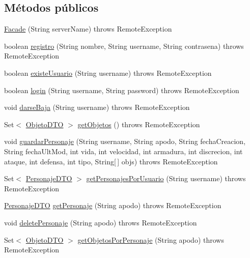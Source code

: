 \subsection*{Métodos públicos}
\begin{DoxyCompactItemize}
\item 
\hyperlink{classes_1_1deusto_1_1spq_1_1_t_e_scc_1_1servidor_1_1_facade_ac697ac7842a1161dec65e9985d496d64}{Facade} (String server\+Name)  throws Remote\+Exception 
\item 
boolean \hyperlink{classes_1_1deusto_1_1spq_1_1_t_e_scc_1_1servidor_1_1_facade_a7c19da5dcaeed4689168bccf1a82b626}{registro} (String nombre, String username, String contrasena)  throws Remote\+Exception 
\item 
boolean \hyperlink{classes_1_1deusto_1_1spq_1_1_t_e_scc_1_1servidor_1_1_facade_ae25a9999c202d8c89edaa92131247ce9}{existe\+Usuario} (String username)  throws Remote\+Exception 
\item 
boolean \hyperlink{classes_1_1deusto_1_1spq_1_1_t_e_scc_1_1servidor_1_1_facade_ad4be9c735e46f8e8f72d0d89e67cd2b2}{login} (String username, String password)  throws Remote\+Exception 
\item 
void \hyperlink{classes_1_1deusto_1_1spq_1_1_t_e_scc_1_1servidor_1_1_facade_a458dfcc4b1129b9b6e08f41e63ce7086}{darse\+Baja} (String username)  throws Remote\+Exception 
\item 
Set$<$ \hyperlink{classes_1_1deusto_1_1spq_1_1_t_e_scc_1_1dto_1_1_objeto_d_t_o}{Objeto\+D\+T\+O} $>$ \hyperlink{classes_1_1deusto_1_1spq_1_1_t_e_scc_1_1servidor_1_1_facade_a8fcdd8c91b652b43b4928334cc9f3328}{get\+Objetos} ()  throws Remote\+Exception 
\item 
void \hyperlink{classes_1_1deusto_1_1spq_1_1_t_e_scc_1_1servidor_1_1_facade_ae5642510ed14785330e9c7c367f10c93}{guardar\+Personaje} (String username, String apodo, String fecha\+Creacion, String fecha\+Ult\+Mod, int vida, int velocidad, int armadura, int discrecion, int ataque, int defensa, int tipo, String\mbox{[}$\,$\mbox{]} objs)  throws Remote\+Exception 
\item 
Set$<$ \hyperlink{classes_1_1deusto_1_1spq_1_1_t_e_scc_1_1dto_1_1_personaje_d_t_o}{Personaje\+D\+T\+O} $>$ \hyperlink{classes_1_1deusto_1_1spq_1_1_t_e_scc_1_1servidor_1_1_facade_ad4fb2faa5b7665a375ab1a8dd40818fc}{get\+Personajes\+Por\+Usuario} (String username)  throws Remote\+Exception 
\item 
\hyperlink{classes_1_1deusto_1_1spq_1_1_t_e_scc_1_1dto_1_1_personaje_d_t_o}{Personaje\+D\+T\+O} \hyperlink{classes_1_1deusto_1_1spq_1_1_t_e_scc_1_1servidor_1_1_facade_a737891228c477543f1b04a551a2f52c2}{get\+Personaje} (String apodo)  throws Remote\+Exception 
\item 
void \hyperlink{classes_1_1deusto_1_1spq_1_1_t_e_scc_1_1servidor_1_1_facade_ad813b0f96a122a76ec8f14d923d25796}{delete\+Personaje} (String apodo)  throws Remote\+Exception 
\item 
Set$<$ \hyperlink{classes_1_1deusto_1_1spq_1_1_t_e_scc_1_1dto_1_1_objeto_d_t_o}{Objeto\+D\+T\+O} $>$ \hyperlink{classes_1_1deusto_1_1spq_1_1_t_e_scc_1_1servidor_1_1_facade_ab9b38453cd1818c269f2632a9b113cca}{get\+Objetos\+Por\+Personaje} (String apodo)  throws Remote\+Exception 
\end{DoxyCompactItemize}


